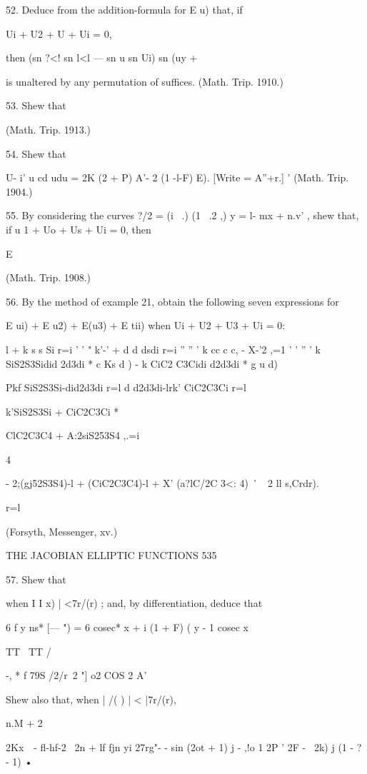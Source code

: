 52. Deduce from the addition-formula for E u) that, if

Ui + U2 + U + Ui = 0,

then (sn ?<! sn l<l — sn u sn Ui) sn (uy + %

is unaltered by any permutation of suffices. (Math. Trip. 1910.)

53. Shew that

(Math. Trip. 1913.)

54. Shew that

U- i' u cd udu = 2K (2 + P) A'- 2 (1 -l-F) E). [Write = A''+r.] '
(Math. Trip. 1904.)

55. By considering the curves ?/2 = (i \ .) (1 \ .2 ,) y = l- mx +
n.v' , shew that, if u 1 + Uo + Us + Ui = 0, then

E %

(Math. Trip. 1908.)

56. By the method of example 21, obtain the following seven
expressions for

E ui) + E u2) + E(u3) + E tii) when Ui + U2 + U3 + Ui = 0:

l + k s s Si r=i ' ' " k'-' + d d dsdi r=i '' '' ' k cc c c, - X-'2
,=1 ' ' '' ' k SiS2S3Sidid 2d3di * c Ks d ) - k CiC2 C3Cidi d2d3di * g
u d)

Pkf SiS2S3Si-did2d3di r=l d d2d3di-lrk' CiC2C3Ci r=l

k'SiS2S3Si + CiC2C3Ci *

ClC2C3C4 + A:2siS253S4 ,.=i

4

- 2;(gj52S3S4)-l + (CiC2C3C4)-l + X' (a?lC/2C 3<: 4)~' ~ 2 ll s,Crdr).

r=l

(Forsyth, Messenger, xv.)



THE JACOBIAN ELLIPTIC FUNCTIONS 535

57. Shew that

when I I x) | <7r/(r) ; and, by differentiation, deduce that

6 f y ns* [— ") = 6 cosec* x + i (1 + F) ( y - 1 cosec x

TT \ TT /

 -, * f 79S /2/r\ 2 "] o2 COS 2 A'

Shew also that, when | /( ) | < |7r/(r),



n.M + 2



2Kx\ \ - fl-hf-2 \ 2n + lf fjn yi 27rg"- - sin (2ot + 1) j - ,!o 1 2P
' 2F - \ 2k) j (1 - ? - 1) •

